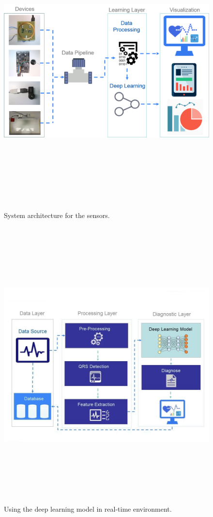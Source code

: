 \begin{figure}[htpb]
	\centering
	\includegraphics[width=17cm,height=15cm,keepaspectratio=true]{images/sys_arc}
	\caption{
		System architecture for the sensors.
	}
	\label{fig:sys_arc}
\end{figure}


\begin{figure}[htpb]
	\centering
	\includegraphics[width=17cm,height=15cm,keepaspectratio=true]{images/using_ann}
	\caption{
		Using the deep learning model in real-time environment.
	}
	\label{fig:using_ann}
\end{figure}
